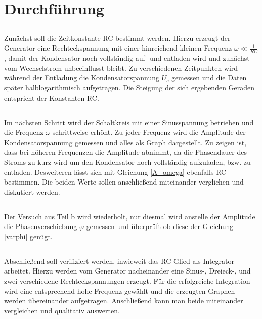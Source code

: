 \section{Durchführung}
\subsection{}
Zunächst soll die Zeitkonstante RC bestimmt werden. Hierzu erzeugt der Generator eine Rechteckspannung mit einer hinreichend kleinen Frequenz $\omega\ll\frac{1}{RC}$, damit der Kondensator noch vollständig auf- und entladen wird und zunächst vom Wechselstrom unbeeinflusst bleibt.
Zu verschiedenen Zeitpunkten wird während der Entladung die Kondensatorspannung $U_c$ gemessen und die Daten später halblogarithmisch aufgetragen. Die Steigung der sich ergebenden Geraden entspricht der Konstanten RC.

\subsection{}
Im nächsten Schritt wird der Schaltkreis mit einer Sinusspannung betrieben und die Frequenz $\omega$ schrittweise erhöht. Zu jeder Frequenz wird die Amplitude der Kondensatorspannung gemessen und alles als Graph dargestellt. Zu zeigen ist, dass bei höheren Frequenzen die Amplitude abnimmt, da die Phasendauer des Stroms zu kurz wird um den Kondensator noch vollständig aufzuladen, bzw. zu entladen. Desweiteren lässt sich mit Gleichung \eqref{A_omega} ebenfalls RC bestimmen. Die beiden Werte sollen anschließend miteinander verglichen und diskutiert werden.

\subsection{}
Der Versuch aus Teil b wird wiederholt, nur diesmal wird anstelle der Amplitude die Phasenverschiebung $\varphi$ gemessen und überprüft ob diese der Gleichung \eqref{varphi} genügt.

\subsection{}
Abschließend soll verifiziert werden, inwieweit das RC-Glied als Integrator arbeitet. Hierzu werden vom Generator nacheinander eine Sinus-, Dreieck-, und zwei verschiedene Rechteckspannungen erzeugt. 
Für die erfolgreiche Integration wird eine entsprechend hohe Frequenz gewählt und die erzeugten Graphen werden übereinander aufgetragen. Anschließend kann man beide miteinander vergleichen und qualitativ auswerten.

